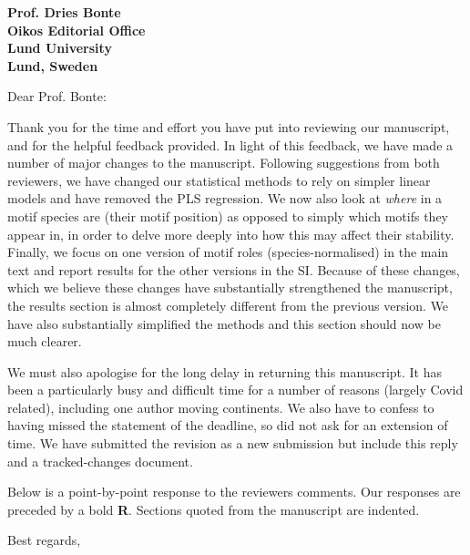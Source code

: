 \documentclass[12pt]{letter}
\begin{document}
\begin{letter}{\bf Prof. Dries Bonte\\
Oikos Editorial Office \\
Lund University \\
Lund, Sweden}


\opening{Dear Prof. Bonte:}

    Thank you for the time and effort you have put into reviewing our manuscript, and for the helpful feedback provided. 
    In light of this feedback, we have made a number of major changes to the manuscript. 
    Following suggestions from both reviewers, we have changed our statistical methods to rely on simpler linear models and have removed the PLS regression. 
    We now also look at \emph{where} in a motif species are (their motif position) as opposed to simply which motifs they appear in, in order to delve more deeply into how this may affect their stability. 
    Finally, we focus on one version of motif roles (species-normalised) in the main text and report results for the other versions in the SI.
    Because of these changes, which we believe these changes have substantially strengthened the manuscript, the results section is almost completely different from the previous version.
    We have also substantially simplified the methods and this section should now be much clearer. 


    We must also apologise for the long delay in returning this manuscript. It has been a particularly busy and difficult time for a number of reasons (largely Covid related), including one author moving continents. We also have to confess to having missed the statement of the deadline, so did not ask for an extension of time. We have submitted the revision as a new submission but include this reply and a tracked-changes document.

    
    Below is a point-by-point response to the reviewers comments. Our responses  are preceded by a bold \textbf{R}. Sections quoted from the manuscript are indented.


    \closing{Best regards,}

    \clearpage



\end{letter}
\end{document}
